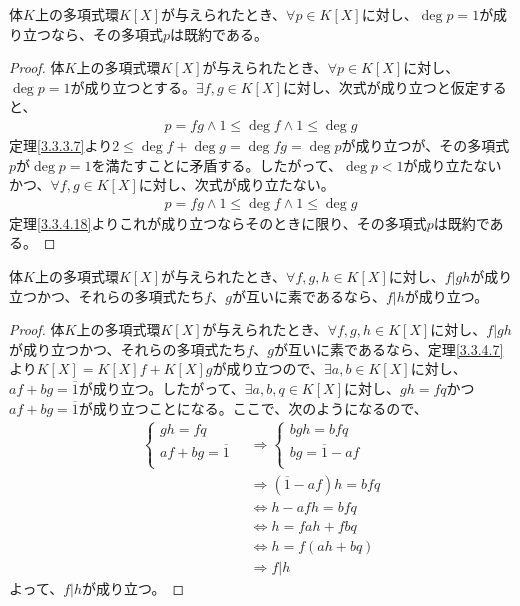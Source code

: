 \documentclass[dvipdfmx]{jsarticle}
\begin{document}
\begin{thm}\label{3.3.4.19}
体$K$上の多項式環$K[ X]$が与えられたとき、$\forall p \in K[ X]$に対し、$\deg p = 1$が成り立つなら、その多項式$p$は既約である。
\end{thm}
\begin{proof}
体$K$上の多項式環$K[ X]$が与えられたとき、$\forall p \in K[ X]$に対し、$\deg p = 1$が成り立つとする。$\exists f,g \in K[ X]$に対し、次式が成り立つと仮定すると、
\begin{align*}
p = fg \land 1 \leq \deg f \land 1 \leq \deg g
\end{align*}
定理\ref{3.3.3.7}より$2 \leq \deg f + \deg g = \deg{fg} = \deg p$が成り立つが、その多項式$p$が$\deg p = 1$を満たすことに矛盾する。したがって、$\deg p < 1$が成り立たないかつ、$\forall f,g \in K[ X]$に対し、次式が成り立たない。
\begin{align*}
p = fg \land 1 \leq \deg f \land 1 \leq \deg g
\end{align*}
定理\ref{3.3.4.18}よりこれが成り立つならそのときに限り、その多項式$p$は既約である。
\end{proof}
\begin{thm}\label{3.3.4.20}
体$K$上の多項式環$K[ X]$が与えられたとき、$\forall f,g,h \in K[ X]$に対し、$f|gh$が成り立つかつ、それらの多項式たち$f$、$g$が互いに素であるなら、$f|h$が成り立つ。
\end{thm}
\begin{proof}
体$K$上の多項式環$K[ X]$が与えられたとき、$\forall f,g,h \in K[ X]$に対し、$f|gh$が成り立つかつ、それらの多項式たち$f$、$g$が互いに素であるなら、定理\ref{3.3.4.7}より$K[ X] = K[ X] f + K[ X] g$が成り立つので、$\exists a,b \in K[ X]$に対し、$af + bg = \overline{1}$が成り立つ。したがって、$\exists a,b,q \in K[ X]$に対し、$gh = fq$かつ$af + bg = \overline{1}$が成り立つことになる。ここで、次のようになるので、
\begin{align*}
\left\{ \begin{matrix}
gh = fq \\
af + bg = \overline{1} \\
\end{matrix} \right.\  &\Rightarrow \left\{ \begin{matrix}
bgh = bfq \\
bg = \overline{1} - af \\
\end{matrix} \right.\ \\
&\Rightarrow \left( \overline{1} - af \right)h = bfq\\
&\Leftrightarrow h - afh = bfq\\
&\Leftrightarrow h = fah + fbq\\
&\Leftrightarrow h = f(ah + bq)\\
&\Rightarrow f|h
\end{align*}
よって、$f|h$が成り立つ。
\end{proof}
\end{document}
